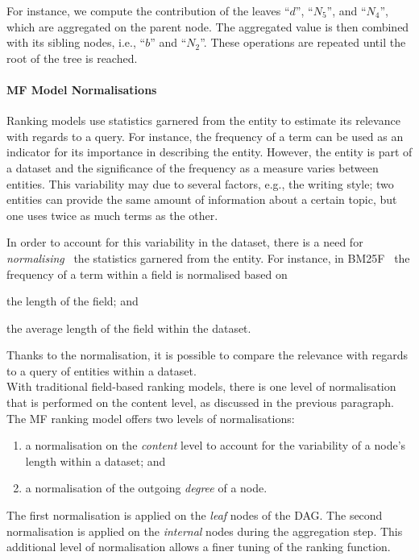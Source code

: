 For instance, we compute the contribution of the leaves ``$d$'', ``$N_5$'', and ``$N_4$'', which are aggregated on the parent node. The aggregated value is then combined with its sibling nodes, i.e., ``$b$'' and ``$N_2$''. These operations are repeated until the root of the tree is reached.

\paragraph{MF Model Normalisations}
\label{chap:tree-ranking:mf-model:norm}

Ranking models use statistics garnered from the entity to estimate its relevance with regards to a query. For instance, the frequency of a term can be used as an indicator for its importance in describing the entity. However, the entity is part of a dataset and the significance of the frequency as a measure varies between entities. This variability may due to several factors, e.g., the writing style; two entities can provide the same amount of information about a certain topic, but one uses twice as much terms as the other.

In order to account for this variability in the dataset, there is a need for \emph{normalising}~\cite{manning:2008:iir} the statistics garnered from the entity. For instance, in BM25F~\cite{zaragoza:2004:microsoft} the frequency of a term within a field is normalised based on
\begin{inparaenum}[(a)]
	\item the length of the field; and
	\item the average length of the field within the dataset.
\end{inparaenum}
Thanks to the normalisation, it is possible to compare the relevance with regards to a query of entities within a dataset.\\

With traditional field-based ranking models, there is one level of normalisation that is performed on the content level, as discussed in the previous paragraph.
The MF ranking model offers two levels of normalisations:
\begin{enumerate}
	\item a normalisation on the \emph{content} level to account for the variability of a node's length within a dataset; and
	\label{norm:content}
	\item a normalisation of the outgoing \emph{degree} of a node.
	\label{norm:degree}
\end{enumerate}
The first normalisation is applied on the \emph{leaf} nodes of the DAG. The second normalisation is applied on the \emph{internal} nodes during the aggregation step. This additional level of normalisation allows a finer tuning of the ranking function.

